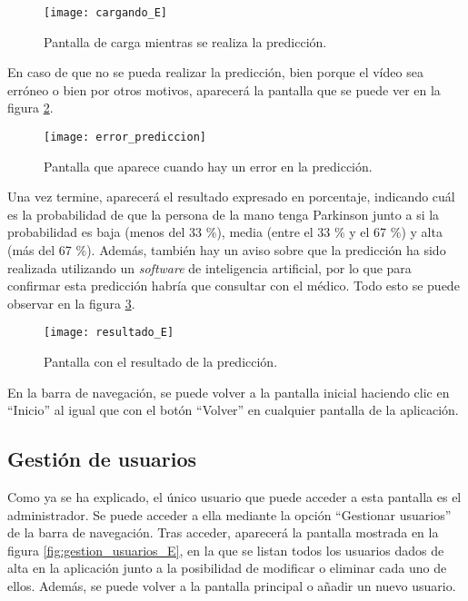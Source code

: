\begin{figure}[ht]
	\texttt{[image: cargando\_E]}
	\caption{Pantalla de carga mientras se realiza la predicción.}
	\label{fig:cargando_E}
\end{figure}

En caso de que no se pueda realizar la predicción, bien porque el vídeo sea erróneo o bien por otros motivos, aparecerá la pantalla que se puede ver en la figura \ref{fig:error_prediccion}.

\begin{figure}[ht]
	\texttt{[image: error\_prediccion]}
	\caption{Pantalla que aparece cuando hay un error en la predicción.}
	\label{fig:error_prediccion}
\end{figure}

Una vez termine, aparecerá el resultado expresado en porcentaje, indicando cuál es la probabilidad de que la persona de la mano tenga Parkinson junto a si la probabilidad es baja (menos del 33 \%), media (entre el 33 \% y el 67 \%) y alta (más del 67 \%). Además, también hay un aviso sobre que la predicción ha sido realizada utilizando un \textit{software} de inteligencia artificial, por lo que para confirmar esta predicción habría que consultar con el médico. Todo esto se puede observar en la figura \ref{fig:resultado_E}.

\begin{figure}[ht]
	\texttt{[image: resultado\_E]}
	\caption{Pantalla con el resultado de la predicción.}
	\label{fig:resultado_E}
\end{figure}

En la barra de navegación, se puede volver a la pantalla inicial haciendo clic en ``Inicio'' al igual que con el botón ``Volver'' en cualquier pantalla de la aplicación.

\subsection{Gestión de usuarios}
Como ya se ha explicado, el único usuario que puede acceder a esta pantalla es el administrador. Se puede acceder a ella mediante la opción ``Gestionar usuarios'' de la barra de navegación. Tras acceder, aparecerá la pantalla mostrada en la figura \ref{fig:gestion_usuarios_E}, en la que se listan todos los usuarios dados de alta en la aplicación junto a la posibilidad de modificar o eliminar cada uno de ellos. Además, se puede volver a la pantalla principal o añadir un nuevo usuario.

